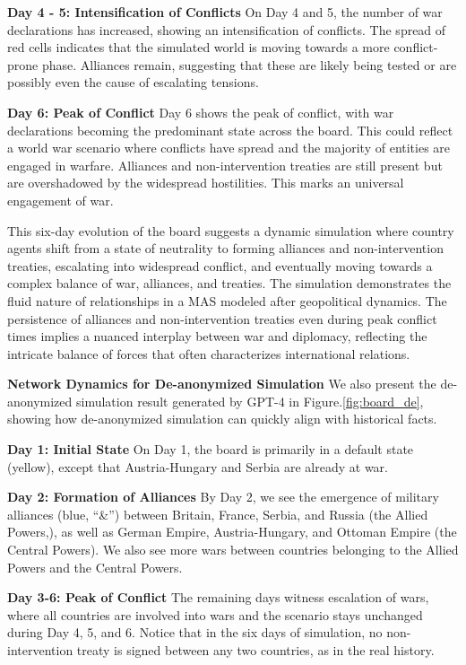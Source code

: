\documentclass{article}
\begin{document}
\textbf{Day 4 - 5: Intensification of Conflicts} On Day 4 and 5, the number of war declarations has increased, showing an intensification of conflicts. The spread of red cells indicates that the simulated world is moving towards a more conflict-prone phase. Alliances remain, suggesting that these are likely being tested or are possibly even the cause of escalating tensions.

\textbf{Day 6: Peak of Conflict} Day 6 shows the peak of conflict, with war declarations becoming the predominant state across the board. This could reflect a world war scenario where conflicts have spread and the majority of entities are engaged in warfare. Alliances and non-intervention treaties are still present but are overshadowed by the widespread hostilities. This marks an universal engagement of war.

This six-day evolution of the board suggests a dynamic simulation where country agents shift from a state of neutrality to forming alliances and non-intervention treaties, escalating into widespread conflict, and eventually moving towards a complex balance of war, alliances, and treaties. The simulation demonstrates the fluid nature of relationships in a MAS modeled after geopolitical dynamics. The persistence of alliances and non-intervention treaties even during peak conflict times implies a nuanced interplay between war and diplomacy, reflecting the intricate balance of forces that often characterizes international relations.

\textbf{Network Dynamics for De-anonymized Simulation} We also present the de-anonymized simulation result generated by GPT-4 in Figure.\ref{fig:board_de}, showing how de-anonymized simulation can quickly align with historical facts. 

\textbf{Day 1: Initial State} On Day 1, the board is primarily in a default state (yellow), except that Austria-Hungary and Serbia are already at war.

\textbf{Day 2: Formation of Alliances} By Day 2, we see the emergence of military alliances (blue, ``\&'') between Britain, France, Serbia, and Russia (the Allied Powers,), as well as German Empire, Austria-Hungary, and Ottoman Empire (the Central Powers). We also see more wars between countries belonging to the Allied Powers and the Central Powers. 

\textbf{Day 3-6: Peak of Conflict} The remaining days witness escalation of wars, where all countries are involved into wars and the scenario stays unchanged during Day 4, 5, and 6. Notice that in the six days of simulation, no non-intervention treaty is signed between any two countries, as in the real history.
\end{document}
